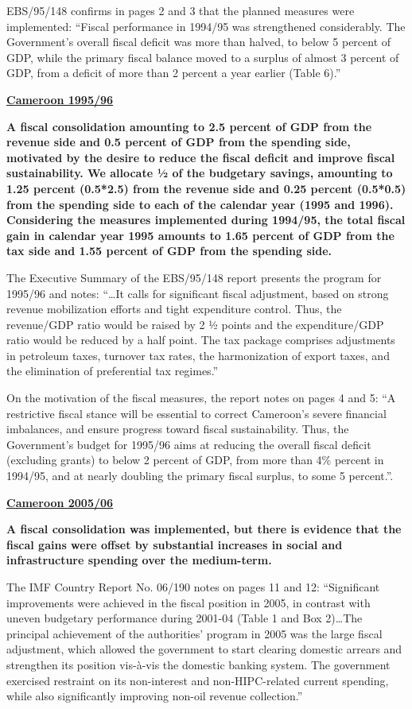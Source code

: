 EBS/95/148 confirms in pages 2 and 3 that the planned measures were implemented: “Fiscal performance in 1994/95 was strengthened considerably. The Government's overall fiscal deficit was more than halved, to below 5 percent of GDP, while the primary fiscal balance moved to a surplus of almost 3 percent of GDP, from a deficit of more than 2 percent a year earlier (Table 6).”

\textbf{\underline{Cameroon 1995/96}}

\textbf{A fiscal consolidation amounting to 2.5 percent of GDP from the revenue side and 0.5 percent of GDP from the spending side, motivated by the desire to reduce the fiscal deficit and improve fiscal sustainability. We allocate ½ of the budgetary savings, amounting to 1.25 percent (0.5*2.5) from the revenue side and 0.25 percent (0.5*0.5) from the spending side to each of the calendar year (1995 and 1996). Considering the measures implemented during 1994/95, the total fiscal gain in calendar year 1995 amounts to 1.65 percent of GDP from the tax side and 1.55 percent of GDP from the spending side.}

The Executive Summary of the EBS/95/148 report presents the program for 1995/96 and notes: “…It calls for significant fiscal adjustment, based on strong revenue mobilization efforts and tight expenditure control. Thus, the revenue/GDP ratio would be raised by 2 ½ points and the expenditure/GDP ratio would be reduced by a half point. The tax package comprises adjustments in petroleum taxes, turnover tax rates, the harmonization of export taxes, and the elimination of preferential tax regimes.”

On the motivation of the fiscal measures, the report notes on pages 4 and 5: “A restrictive fiscal stance will be essential to correct Cameroon's severe financial imbalances, and ensure progress toward fiscal sustainability. Thus, the Government's budget for 1995/96 aims at reducing the overall fiscal deficit (excluding grants) to below 2 percent of GDP, from more than 4\% percent in 1994/95, and at nearly doubling the primary fiscal surplus, to some 5 percent.”.

\textbf{\underline{Cameroon 2005/06}}

\textbf{A fiscal consolidation was implemented, but there is evidence that the fiscal gains were offset by substantial increases in social and infrastructure spending over the medium-term.}

The IMF Country Report No. 06/190 notes on pages 11 and 12: “Significant improvements were achieved in the fiscal position in 2005, in contrast with uneven budgetary performance during 2001-04 (Table 1 and Box 2)…The principal achievement of the authorities’ program in 2005 was the large fiscal adjustment, which allowed the government to start clearing domestic arrears and strengthen its position vis-à-vis the domestic banking system. The government exercised restraint on its non-interest and non-HIPC-related current spending, while also significantly improving non-oil revenue collection.”

